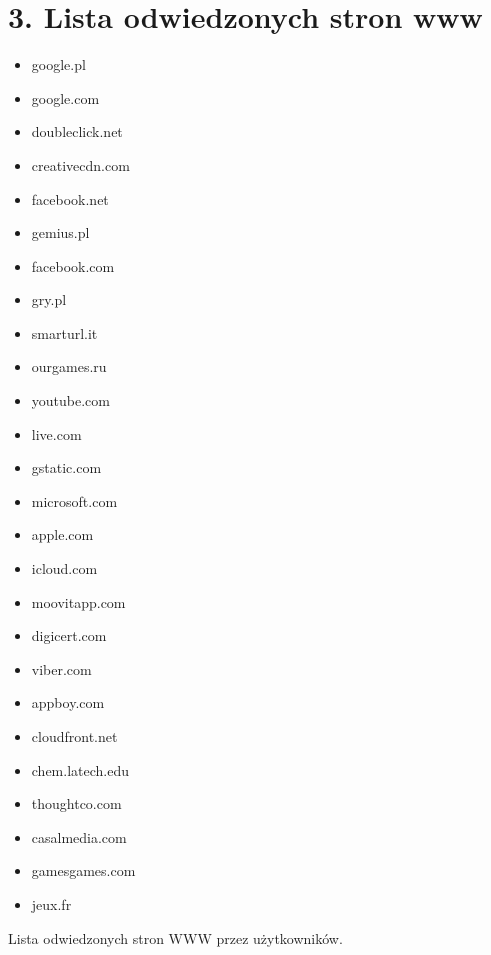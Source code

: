 \documentclass[12pt, a4paper]{article}
\begin{document}
\section*{3. Lista odwiedzonych stron www}
\begin{multicols}{2}
    \begin{itemize}
        \item google.pl 
        \item google.com
        \item doubleclick.net 
        \item creativecdn.com 
        \item facebook.net 
        \item gemius.pl 
        \item facebook.com
        \item gry.pl 
        \item smarturl.it 
        \item ourgames.ru 
        \item youtube.com 
        \item live.com 
        \item gstatic.com 
        \item microsoft.com
        \item apple.com 
        \item icloud.com
        \item moovitapp.com 
        \item digicert.com
        \item viber.com 
        \item appboy.com 
        \item cloudfront.net 
        \item chem.latech.edu
        \item thoughtco.com 
        \item casalmedia.com 
        \item gamesgames.com 
        \item jeux.fr 
    \end{itemize}
\end{multicols}
\vspace{5mm}
Lista odwiedzonych stron WWW przez użytkowników.
\end{document}
